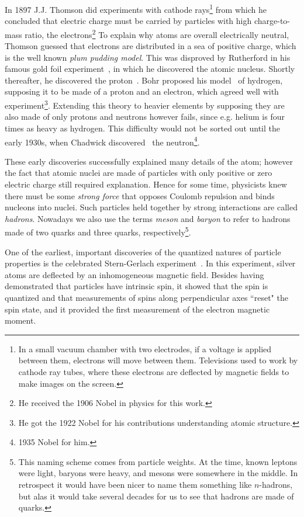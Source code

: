 In 1897 J.J. Thomson did experiments with cathode rays\footnote{In a small
vacuum chamber with two electrodes, if a voltage is applied between them,
electrons will move between them. Televisions used to work by cathode ray tubes,
 where these electrons are deflected by magnetic fields
to make images on the screen.}
from which he concluded that electric charge must be carried by particles
with high charge-to-mass ratio, the electrons\footnote{He received the 1906
Nobel in physics for this work.} 
To explain why atoms are overall electrically neutral, Thomson guessed that
electrons are distributed in a sea of positive charge, which is the
well known {\it plum pudding model}. This was
disproved by Rutherford in his famous gold foil
experiment~\cite{rutherford_scattering_1911}, in which he discovered
the atomic nucleus. Shortly thereafter, he discovered the
proton~\cite{rutherford_collision_1919}.
Bohr proposed his model~\cite{bohr_constitution_1913}
of hydrogen, supposing it to be made of a proton and an electron, which agreed
well with experiment\footnote{He got the 1922 Nobel for his
contributions understanding atomic structure.}. Extending this theory to 
heavier elements by supposing
they are also made of only protons and neutrons however fails, since e.g. helium
is four times as heavy as hydrogen. This difficulty would not be sorted out
until the early 1930s, when Chadwick discovered~\cite{chadwick_possible_1932}
the neutron\footnote{1935 Nobel for him.}.


These early discoveries successfully explained many details of the atom; however
the fact that atomic nuclei are made of particles with only positive or zero
electric charge still required explanation.
Hence for some time, physicists
knew there must be some {\it strong force} that opposes
Coulomb repulsion and binds nucleons into nuclei.
Such particles held together by strong interactions are called
{\it hadrons}. Nowadays we also use the terms {\it meson}
 and {\it baryon} to refer to hadrons made of
two quarks and three quarks, respectively\footnote{This naming scheme
comes from particle weights. At the time, known leptons were light, 
baryons were heavy, and mesons were somewhere in the middle. In retrospect it
would have been nicer to name them something like $n$-hadrons, but alas it would
take several decades for us to see that hadrons are made of quarks.}.


One of the earliest, important discoveries of the quantized natures of particle
properties is the celebrated Stern-Gerlach
experiment~\cite{gerlach_experimentelle_1922a,gerlach_magnetische_1922b,gerlach_experimentelle_1922c}. 
In this experiment, silver atoms
are deflected by an inhomogeneous magnetic field.
Besides having demonstrated that particles have intrinsic spin, it showed that
the spin is quantized and that measurements of spins along perpendicular axes
``reset" the spin state, and it provided the first measurement of the electron
magnetic moment.


